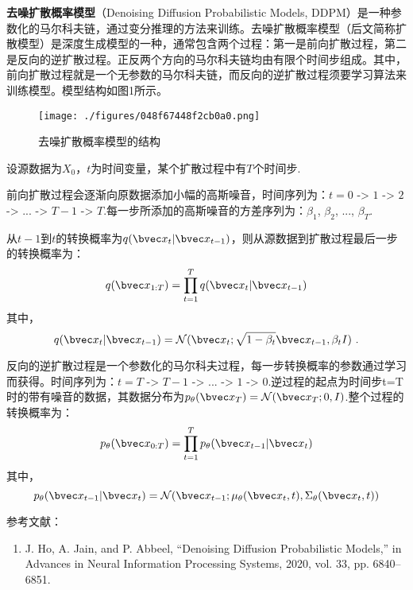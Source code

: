 
\textbf{去噪扩散概率模型}（Denoising Diffusion Probabilistic Models, DDPM）是一种参数化的马尔科夫链，通过变分推理的方法来训练。去噪扩散概率模型（后文简称扩散模型）是深度生成模型的一种，通常包含两个过程：第一是前向扩散过程，第二是反向的逆扩散过程。正反两个方向的马尔科夫链均由有限个时间步组成。其中，前向扩散过程就是一个无参数的马尔科夫链，而反向的逆扩散过程须要学习算法来训练模型。模型结构如图1所示。
\begin{figure}[ht]
\centering
\texttt{[image: ./figures/048f67448f2cb0a0.png]}
\caption{去噪扩散概率模型的结构} \label{fig_DDPM_1}
\end{figure}

设源数据为$X_0$，$t$为时间变量，某个扩散过程中有$T$个时间步.

前向扩散过程会逐渐向原数据添加小幅的高斯噪音，时间序列为：$t=0$ -> $1$ -> $2$ -> ... -> $T-1$ -> $T$.每一步所添加的高斯噪音的方差序列为：$\beta_1$, $\beta_2$, ..., $\beta_T$.

从$t-1$到$t$的转换概率为$q(\bvec x_t|\bvec x_{t-1})$，则从源数据到扩散过程最后一步的转换概率为：
\begin{equation}
q(\bvec x_{1:T})=\prod_{t=1}^{T}q(\bvec x_{t}|\bvec x_{t-1})
\end{equation}
其中，
\begin{equation}
q(\bvec x_{t}|\bvec x_{t-1})=\mathcal{N}(\bvec x_t;\sqrt{1-\beta_t}\bvec x_{t-1},\beta_tI)~.
\end{equation}

反向的逆扩散过程是一个参数化的马尔科夫过程，每一步转换概率的参数通过学习而获得。时间序列为：$t=T$ -> $T-1$ -> ... -> $1$ -> $0$.逆过程的起点为时间步t=T时的带有噪音的数据，其数据分布为$p_\theta(\bvec x_T)=\mathcal{N}(\bvec x_T;0,I)$.整个过程的转换概率为：
\begin{equation}
p_{\theta}(\bvec x_{0:T})=\prod_{t=1}^{T}p_{\theta}(\bvec x_{t-1}|\bvec x_{t})
\end{equation}
其中，
\begin{equation}
p_{\theta}(\bvec x_{t-1}|\bvec x_{t})=\mathcal{N}(\bvec x_{t-1};\mu_\theta(\bvec x_{t},t),\Sigma_\theta(\bvec x_t,t))
\end{equation}


参考文献：
\begin{enumerate}
\item J. Ho, A. Jain, and P. Abbeel, “Denoising Diffusion Probabilistic Models,” in Advances in Neural Information Processing Systems, 2020, vol. 33, pp. 6840–6851.
\end{enumerate}